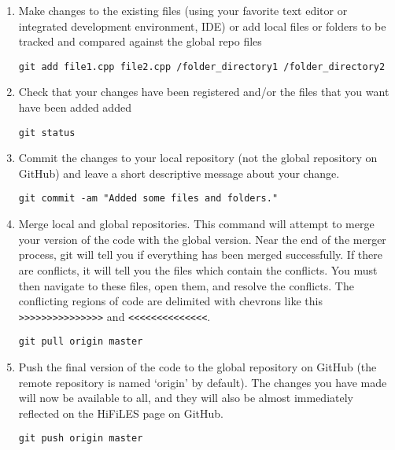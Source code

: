 \documentclass[letter,10pt]{article}
\newcommand*{\TitleFont}{%
      \usefont{\encodingdefault}{\rmdefault}{b}{n}%
      \fontsize{10}{20}%
      \selectfont}
\begin{document}
\begin{enumerate}
 
 \item Make changes to the existing files (using your favorite text editor or integrated development environment, IDE) or add local files or folders to be tracked and compared against the global repo files
\begin{verbatim}
git add file1.cpp file2.cpp /folder_directory1 /folder_directory2
\end{verbatim}

\item Check that your changes have been registered and/or the files that you want have been added added
\begin{verbatim}
git status 
\end{verbatim}\hline

\item Commit the changes to your local repository (not the
global repository on GitHub) and leave a short descriptive message about your change. 
\begin{verbatim}
git commit -am "Added some files and folders."
\end{verbatim}

\item Merge local and global repositories.
 This command will attempt to merge your version of the code with the global
version. Near the end of the merger process, git will tell you if everything has
been merged successfully. If there are conflicts, it will tell you the files
which contain the conflicts. You must then navigate to these files, open them,
and resolve the conflicts. The conflicting regions of code are delimited with
chevrons like this \texttt{>>>>>>>>>>>>>>>} and \texttt{<<<<<<<<<<<<<<}.
\begin{verbatim}
git pull origin master
\end{verbatim}

\item Push the final version of the code to the global repository on GitHub (the remote repository is named `origin' by default). The changes you have made will now be available to all, and they will also be almost immediately reflected on the HiFiLES page on GitHub.
\begin{verbatim}
git push origin master 
\end{verbatim}

\end{enumerate}

\section*{\TitleFont{Branching in Git}}
\end{document}
